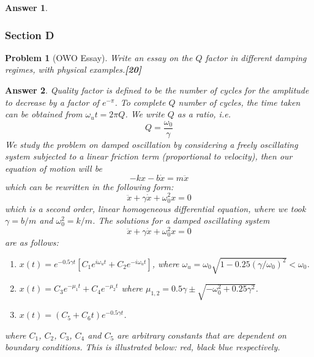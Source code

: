 \documentclass[a4paper]{article}
\newtheorem{ans}{Answer}[subsection]
\theoremstyle{new}
\newtheorem{qns}{Problem}[subsection]
\begin{document}
\begin{ans}
\begin{enumerate}[label=(\roman*)]
\end{enumerate}
\end{ans}
\newpage
\subsubsection{Section D}
\begin{qns}[OWO Essay]
Write an essay on the $Q$ factor in different damping regimes, with physical examples.\hfill\textbf{[20]}
\end{qns}
\begin{ans}
Quality factor is defined to be the number of cycles for the amplitude to decrease by a factor of $e^{-\pi}$. To complete $Q$ number of cycles, the time taken can be obtained from $\omega_ut=2\pi Q$. We write $Q$ as a ratio, i.e.
$$Q=\frac{\omega_0}{\gamma}$$
We study the problem on damped oscillation by considering a freely oscillating system subjected to a linear friction term (proportional to velocity), then our equation of motion will be
$$-kx-b\dot{x}=m\ddot{x}$$
which can be rewritten in the following form:
$$\ddot{x}+\gamma\dot{x}+\omega_0^2x=0$$
which is a second order, linear homogeneous differential equation, where we took $\gamma=b/m$ and $\omega_0^2=k/m$. The solutions for a damped oscillating system
$$\ddot{x}+\gamma\dot{x}+\omega_0^2x=0$$
are as follows:
\begin{enumerate}
    \item $x(t)=e^{-0.5\gamma t}[C_1e^{i\omega_ut}+C_2e^{-i\omega_ut}]$, where $\omega_u=\omega_0\sqrt{1-0.25(\gamma/\omega_0)^2}<\omega_0$.
    \item $x(t)=C_3e^{-\mu_1t}+C_4e^{-\mu_2t}$ where $\mu_{1,2}=0.5\gamma\pm\sqrt{-\omega_0^2+0.25\gamma^2}$.
    \item $x(t)=(C_5+C_6t)e^{-0.5\gamma t}$.
\end{enumerate}
where $C_1$, $C_2$, $C_3$, $C_4$ and $C_5$ are arbitrary constants that are dependent on boundary conditions. This is illustrated below: red, black blue respectively.
\begin{center}

\end{center}
\end{ans}
\end{document}

